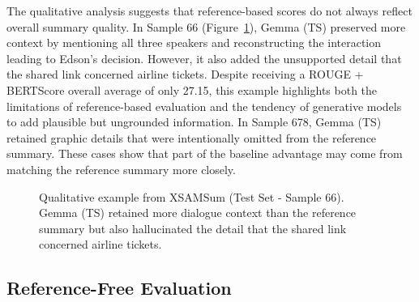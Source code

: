 \documentclass[11pt]{article}
\begin{document}
The qualitative analysis suggests that reference-based scores do not always reflect overall summary quality. In Sample 66 (Figure~\ref{fig:sample66}), Gemma (TS) preserved more context by mentioning all three speakers and reconstructing the interaction leading to Edson's decision. However, it also added the unsupported detail that the shared link concerned airline tickets. Despite receiving a ROUGE + BERTScore overall average of only 27.15, this example highlights both the limitations of reference-based evaluation and the tendency of generative models to add plausible but ungrounded information. In Sample 678, Gemma (TS) retained graphic details that were intentionally omitted from the reference summary. These cases show that part of the baseline advantage may come from matching the reference summary more closely.

\begin{figure}[t]
\centering

\hfill
{}
\hfill
{}

\caption{Qualitative example from XSAMSum (Test Set - Sample 66). Gemma (TS) retained more dialogue context than the reference summary but also hallucinated the detail that the shared link concerned airline tickets.}
\label{fig:sample66}
\end{figure}

\subsection{Reference-Free Evaluation}
\end{document}
